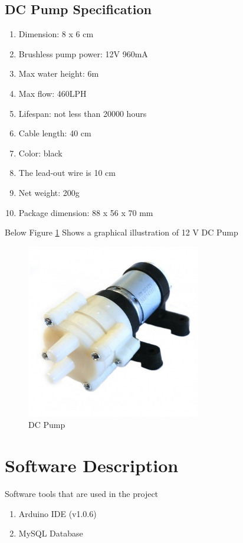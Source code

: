 \subsection{DC Pump Specification}
\begin{enumerate}
  \item Dimension: 8 x 6 cm
  \item	Brushless pump power: 12V 960mA
  \item	Max water height: 6m
  \item	Max flow: 460LPH
  \item	Lifespan: not less than 20000 hours
  \item	Cable length: 40 cm
  \item	Color: black
  \item	The lead-out wire is 10 cm
  \item	Net weight: 200g
  \item	Package dimension: 88 x 56 x 70 mm
\end{enumerate}

Below Figure \ref{fig9} Shows a graphical illustration of 12 V DC Pump

\begin{figure}[h]
  \centering
  \includegraphics[width=3in]{9}
  \caption{DC Pump}\label{fig9}
\end{figure}

\section{Software Description}
Software tools that are used in the project

\begin{enumerate}
  \item	Arduino IDE (v1.0.6)
  \item	MySQL Database
\end{enumerate}


